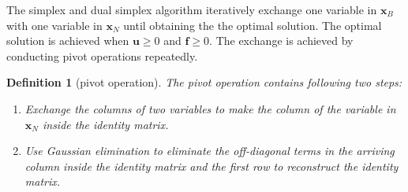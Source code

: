 \documentclass[letterpaper]{article}
\newtheorem{definition}{Definition}
\begin{document}
The simplex and dual simplex algorithm iteratively exchange one variable in $\mathbf{x}_B$ with one variable in $\mathbf{x}_N$ until obtaining the the optimal solution. The optimal solution is achieved when $\mathbf{u}\ge 0$ and $\mathbf{f}\ge 0$.
The exchange is achieved by conducting pivot operations  repeatedly.
\begin{definition}[pivot operation]
The pivot operation contains following two steps:
\begin{enumerate}
\item Exchange the columns of two variables to make the column of the variable in $\mathbf{x}_N$ inside the identity matrix.
\item Use Gaussian elimination to eliminate the off-diagonal terms in the arriving column inside the identity matrix and the first row to reconstruct the identity matrix.
\end{enumerate}
\end{definition}



\end{document}

